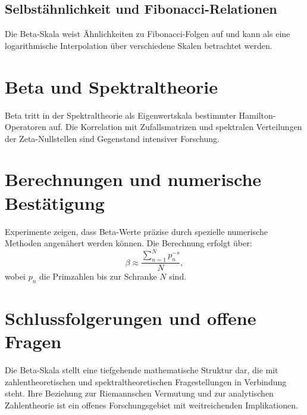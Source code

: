 \documentclass[a4paper,11pt]{article}
\begin{document}
\subsection{Selbstähnlichkeit und Fibonacci-Relationen}
Die Beta-Skala weist Ähnlichkeiten zu Fibonacci-Folgen auf und kann als eine logarithmische Interpolation über verschiedene Skalen betrachtet werden.

\section{Beta und Spektraltheorie}
Beta tritt in der Spektraltheorie als Eigenwertskala bestimmter Hamilton-Operatoren auf. Die Korrelation mit Zufallsmatrizen und spektralen Verteilungen der Zeta-Nullstellen sind Gegenstand intensiver Forschung.

\section{Berechnungen und numerische Bestätigung}
Experimente zeigen, dass Beta-Werte präzise durch spezielle numerische Methoden angenähert werden können. Die Berechnung erfolgt über:
\begin{equation}
    \beta \approx \frac{\sum_{n=1}^{N} p_n^{-s}}{N},
\end{equation}
wobei $p_n$ die Primzahlen bis zur Schranke $N$ sind.

\section{Schlussfolgerungen und offene Fragen}
Die Beta-Skala stellt eine tiefgehende mathematische Struktur dar, die mit zahlentheoretischen und spektraltheoretischen Fragestellungen in Verbindung steht. Ihre Beziehung zur Riemannschen Vermutung und zur analytischen Zahlentheorie ist ein offenes Forschungsgebiet mit weitreichenden Implikationen.
\end{document}
